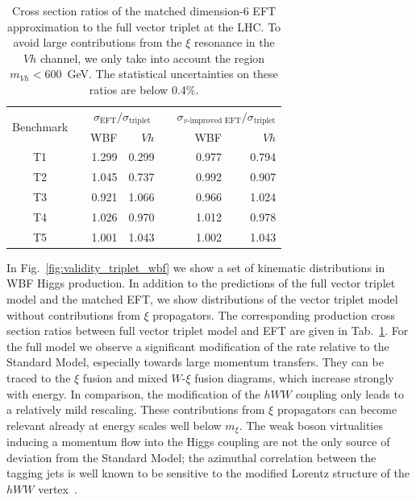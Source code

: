 \begin{table}[t] \renewcommand{\arraystretch}{1.2} \centering
    \begin{tabular}{c c rr c rr} \toprule \multirow{2}{*}{Benchmark}
&\hspace*{1em}& \multicolumn{2}{c}{$\sigma_\text{EFT} /
\sigma_\text{triplet}$} &\hspace*{1em}&
\multicolumn{2}{c}{$\sigma_\text{$v$-improved EFT} /
\sigma_\text{triplet}$}\\ \cmidrule{3-4} \cmidrule{6-7} && WBF & $Vh$
&& WBF & $Vh$ \\ \midrule T1 && 1.299 & 0.299 && 0.977 & 0.794 \\ T2
&& 1.045 & 0.737 && 0.992 & 0.907 \\ T3 && 0.921 & 1.066 && 0.966 &
1.024 \\ T4 && 1.026 & 0.970 && 1.012 & 0.978 \\ T5 && 1.001 & 1.043
&& 1.002 & 1.043 \\ \bottomrule
    \end{tabular}
    \caption{Cross section ratios of the matched dimension-6 EFT
approximation to the full vector triplet at the LHC.  To avoid large
contributions from the $\xi$ resonance in the $Vh$ channel, we only
take into account the region $m_{Vh} < 600$~GeV.  The statistical
uncertainties on these ratios are below 0.4\%.}
  \label{tab:triplet_rates}
\end{table}

In Fig.~\ref{fig:validity_triplet_wbf} we show a set of kinematic distributions
in WBF Higgs production. In addition to the predictions of the full
vector triplet model and the matched EFT, we show distributions of the
vector triplet model without contributions from $\xi$ propagators.
The corresponding production cross section ratios between full vector
triplet model and EFT are given in Tab.~\ref{tab:triplet_rates}.  For
the full model we observe a significant modification of the rate
relative to the Standard Model, especially towards large momentum
transfers. They can be traced to the $\xi$ fusion and mixed $W$-$\xi$
fusion diagrams, which increase strongly with energy. In comparison,
the modification of the $hWW$ coupling only leads to a relatively mild
rescaling.  These contributions from $\xi$ propagators can become
relevant already at energy scales well below $m_\xi$. The weak boson
virtualities inducing a momentum flow into the Higgs coupling are not
the only source of deviation from the Standard Model; the azimuthal
correlation between the tagging jets is well known to be sensitive to
the modified Lorentz structure of the $hWW$ vertex~\cite{phi_jj}.

